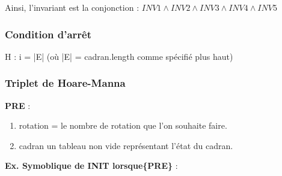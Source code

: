 \documentclass[a4paper, 12pt]{article}
\begin{document}
Ainsi, l'invariant est la conjonction : $INV 1 \wedge INV 2 \wedge INV 3 \wedge INV 4 \wedge INV 5$



\subsubsection*{Condition d'arrêt}

H : i = |E| (où |E| = cadran.length comme spécifié plus haut)

\subsubsection{Triplet de Hoare-Manna}

\textbf{PRE} :
\begin{enumerate}
 \item rotation = le nombre de rotation que l'on souhaite faire. 
 \item cadran un tableau non vide représentant l'état du cadran.
\end{enumerate}

\vspace{0.2cm}

\textbf{Ex. Symoblique de INIT lorsque\{PRE\}} :
\end{document}
